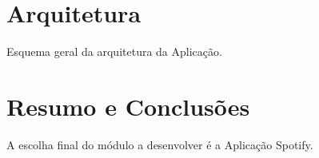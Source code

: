 

\section{Arquitetura} %
\label{sec:arquitetura}

  Esquema geral da arquitetura da Aplicação.


\section{Resumo e Conclusões}

  A escolha final do módulo a desenvolver é a Aplicação Spotify.
